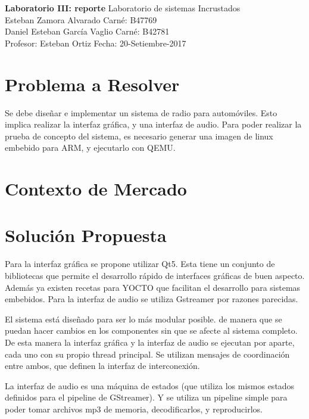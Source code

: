 

\noindent
\large\textbf{Laboratorio III: reporte} \hfill Laboratorio de sistemas Incrustados \\
\normalsize Esteban Zamora Alvarado \hfill Carné: B47769 \\
Daniel Esteban García Vaglio \hfill Carné: B42781 \\
Profesor: Esteban Ortiz  \hfill Fecha: 20-Setiembre-2017 \\

\section{Problema a Resolver}
\label{sec:Problem}
Se debe diseñar e implementar un sistema de radio para automóviles. Esto implica realizar la
interfaz gráfica, y una interfaz de audio. Para poder realizar la prueba de concepto del sistema, es
necesario generar una imagen de linux embebido para ARM, y ejecutarlo con QEMU. 

\section{Contexto de Mercado}
\label{sec:Context}

\section{Solución Propuesta}
\label{sec:solution}
Para la interfaz gráfica se propone utilizar Qt5. Esta tiene un conjunto de bibliotecas que permite
el desarrollo rápido de interfaces gráficas de buen aspecto. Además ya existen recetas para YOCTO
que facilitan el desarrollo para sistemas embebidos. Para la interfaz de audio se utiliza Gstreamer
por razones parecidas.

El sistema está diseñado para ser lo más modular posible. de manera que se puedan hacer cambios en
los componentes sin que se afecte al sistema completo. De esta manera la interfaz gráfica y la
interfaz de audio se ejecutan por aparte, cada uno con su propio thread principal. Se utilizan
mensajes de coordinación entre ambos, que definen la interfaz de interconexión.

La interfaz de audio es una máquina de estados (que utiliza los mismos estados definidos para el
pipeline de GStreamer). Y se utiliza un pipeline simple para poder tomar archivos mp3 de memoria,
decodificarlos, y reproducirlos.

